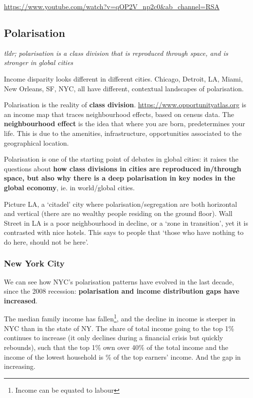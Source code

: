 \documentclass{article}
\begin{document}
\url{https://www.youtube.com/watch?v=qOP2V_np2c0&ab_channel=RSA}

\subsection{Polarisation}

\textit{tldr; polarisation is a class division that is reproduced through space, and is stronger in global cities}

Income disparity looks different in different cities. Chicago, Detroit, LA, Miami, New Orleans, SF, NYC, all have different, contextual landscapes of polarisation.

Polarisation is the reality of \textbf{class division}. \url{https://www.opportunityatlas.org} is an income map that traces neighbourhood effects, based on census data. The \textbf{neighbourhood effect} is the idea that where you are born, predetermines your life. This is due to the amenities, infrastructure, opportunities associated to the geographical location.

Polarisation is one of the starting point of debates in global cities: it raises the questions about \textbf{how class divisions in cities are reproduced in/through space, but also why there is a deep polarisation in key nodes in the global economy}, ie. in world/global cities.

Picture LA, a `citadel' city where polarisation/segregation are both horizontal and vertical (there are no wealthy people residing on the ground floor). Wall Street in LA is a poor neighbourhood in decline, or a `zone in transition', yet it is contrasted with nice hotels. This says to people that `those who have nothing to do here, should not be here'.

\subsubsection{New York City}

We can see how NYC's polarisation patterns have evolved in the last decade, since the 2008 recession: \textbf{polarisation and income distribution gaps have increased}. 

The median family income has fallen\footnote{Income can be equated to labour}, and the decline in income is steeper in NYC than in the state of NY. The share of total income going to the top 1\% continues to increase (it only declines during a financial crisis but quickly rebounds), such that the top 1\% own over 40\% of the total income and the income of the lowest household is \% of the top earners' income. And the gap in increasing.
\end{document}
